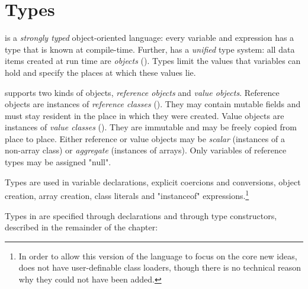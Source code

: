 \chapter{Types}
\label{XtenTypes}

{}\Xten{} is a {\em strongly typed} object-oriented language: every variable
and expression has a type that is known at compile-time. Further,
\Xten{} has a {\em unified} type system: all data items created at
run time are {\em objects} (). Types limit the
values that variables can hold and specify the places at which these
values lie.

{}\Xten{} supports two kinds of objects, {\em reference objects} and
{\em value objects}.  Reference objects are instances of {\em
reference classes} (). They may contain
mutable fields and must stay resident in the place in which they were
created. Value objects are instances of {\em value classes}
(). They are immutable and may be freely copied
from place to place. Either reference or value objects may be 
{\em scalar} (instances of a non-array class) or {\em aggregate} (instances
of arrays).
Only variables of reference types may be assigned \xcd"null".

Types are used in variable declarations, explicit coercions and
conversions, object creation, array
creation, class literals and \xcd"instanceof" expressions.\footnote{In
order to allow this version of the language to focus on the core new
ideas, \XtenCurrVer{} does not have user-definable class loaders,
though there is no technical reason why they could not have been
added.}

Types in \Xten{} are specified through declarations and through
type constructors, described in the remainder of the chapter:

